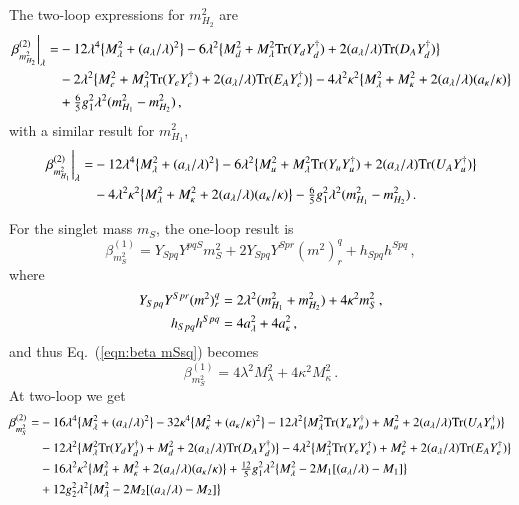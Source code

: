 \documentclass[final,3p,times]{elsarticle}
\newcommand{\lamsq}{\lambda^2}
\newcommand{\kapsq}{\kappa^2}
\newcommand{\tr}{\mathrm{Tr}}
\newcommand{\mhusq}{m^2_{H_2}}
\newcommand{\mhdsq}{m^2_{H_1}}
\newcommand{\mlamsq}{M_\lambda^2}
\newcommand{\mkapsq}{M_\kappa^2}
\newcommand{\Alam}{a_\lambda/\lambda}
\newcommand{\Akap}{a_\kappa/\kappa}
\newcommand{\Musq}{M_u^2}
\newcommand{\Mdsq}{M_d^2}
\newcommand{\Mesq}{M_e^2}
\begin{document}
The two-loop expressions for $m_{H_2}^2$ are 
%
\begin{align}
\left.\beta_{m_{H_2}^2}^{(2)}\right|_\lambda =& -12\lambda^4\big\{ M_\lambda^2 + (\Alam)^2\big\} 
- 6\lamsq\big\{ \Mdsq + M_\lambda^2\tr( Y_d Y_d^\dagger) + 2(a_\lambda/\lambda)\tr( D_A Y_d^\dagger) \big\} \notag \\
%
&-2\lamsq\big\{ \Mesq + M_\lambda^2\tr( Y_e Y_e^\dagger) + 2(a_\lambda/\lambda)\tr( E_A Y_e^\dagger)\big\}
%
-4\lamsq\kapsq\big\{ M_\lambda^2 + M_\kappa^2 + 2(a_\lambda/\lambda)(a_\kappa/\kappa) \big\}  \notag \\
%
&+ \tfrac{6}{5}g_1^2\lamsq(\mhdsq-\mhusq) \,,
\end{align}
%
with a similar result for $m_{H_1}^2$,
%
\begin{align}
\left.\beta_{m_{H_1}^2}^{(2)}\right|_\lambda =& -12\lambda^4\big\{M_\lambda^2 + (\Alam)^2\big\} 
- 6\lamsq\big\{ \Musq + M_\lambda^2\tr( Y_u Y_u^\dagger) + 2(a_\lambda/\lambda)\tr( U_A Y_u^\dagger) \big\} \notag \\
%
&-4\lamsq\kapsq\big\{ M_\lambda^2 + M_\kappa^2 + 2(a_\lambda/\lambda)(a_\kappa/\kappa) \big\} 
- \tfrac{6}{5}g_1^2\lamsq(\mhdsq-\mhusq)\,.
\end{align}

For the singlet mass $m_S$, the one-loop result is
%
\begin{equation}
\beta_{m_S^2}^{(1)} = Y_{Spq}Y^{pqS}m_S^2 + 2Y_{Spq}Y^{Spr}(m^2)^q_r + h_{Spq}h^{Spq}\,, \label{eqn:beta mSsq}
\end{equation}
%
where 
%
\begin{align}
Y_{Spq}Y^{Spr}(m^2)^q_r &= 2\lamsq(\mhdsq + \mhusq) + 4\kapsq m_S^2\,, \notag \\
%
h_{Spq}h^{Spq} &= 4a_\lambda^2 + 4a_\kappa^2\,,
\end{align}
%
and thus Eq.~(\ref{eqn:beta mSsq}) becomes
%
\begin{equation}
\beta_{m_S^2}^{(1)} = 4\lamsq \mlamsq + 4\kapsq \mkapsq\,.
\end{equation}
%
At two-loop we get
\begin{align}
\beta_{m_S^2}^{(2)} =& -16\lambda^4\big\{ \mlamsq + (\Alam)^2\big\} - 32\kappa^4\big\{ \mkapsq + (\Akap)^2\big\}
-12\lamsq\big\{ \mlamsq\tr( Y_u Y_u^\dagger) + \Musq + 2(\Alam)\tr( U_A Y_u^\dagger)\big\} \notag \\
%
&- 12\lamsq\big\{ \mlamsq\tr( Y_d Y_d^\dagger) + \Mdsq + 2(\Alam)\tr( D_A Y_d^\dagger) \big\} 
- 4\lamsq\big\{ \mlamsq\tr( Y_e Y_e^\dagger) + \Mesq + 2(\Alam)\tr( E_A Y_e^\dagger) \big\} \notag \\
%
&- 16\lamsq\kapsq\big\{ \mlamsq + \mkapsq + 2(\Alam)(\Akap) \big\}
+ \tfrac{12}{5}g_1^2\lamsq \big\{ \mlamsq - 2M_1[(\Alam) - M_1] \big\} \notag \\
%
&+ 12g_2^2\lamsq\big\{ \mlamsq -2M_2[(\Alam) - M_2]\big\}
\end{align}
\end{document}
